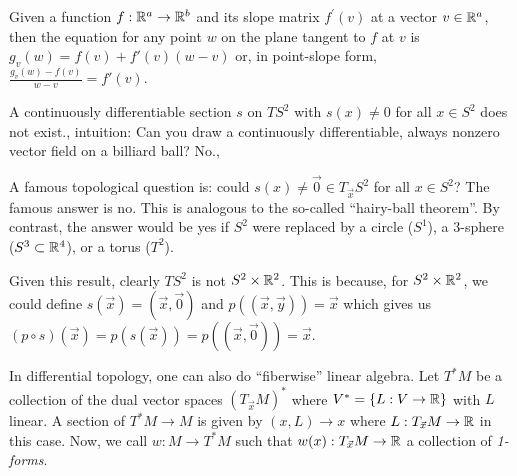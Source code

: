 \documentclass[11pt,leqno,oneside]{amsart}
\begin{document}
\begin{thm}
	Given a function $f : {\mathbb R}^a \to {\mathbb R}^b$ and its slope matrix $f^\prime(v)$ at a vector $v \in {\mathbb R}^a$, then the equation for any point $w$ on the plane tangent to $f$ at $v$ is $g_v(w) = f(v) + f'(v)(w-v)$ or, in point-slope form, $\frac{g_v(w)-f(v)}{w-v} = f'(v)$.
\end{thm}

\begin{thm}
	A continuously differentiable section $s$ on $TS^2$ with $s(x) \neq 0$ for all $x \in S^2$ does not exist.,
	intuition: Can you draw a continuously differentiable, always nonzero vector field on a billiard ball?  No.,
\end{thm}

A famous topological question is: could $s(x) \neq \vec{0} \in T_{\vec{x}}S^2$
for all $x \in S^2$? The famous answer is no. This is analogous to the
so-called ``hairy-ball theorem''. By contrast, the answer would be yes if $S^2$
were replaced by a circle ($S^1$), a 3-sphere ($S^3 \subset {\mathbb R}^4$), or a torus
($T^2$).

Given this result, clearly $TS^2$ is not $S^2 \times {\mathbb R}^2$. This is because,
for $S^2 \times {\mathbb R}^2$, we could define $s(\vec{x}) = (\vec{x}, \vec{0})$ and
$p( (\vec{x},\vec{y}) ) = \vec{x}$ which gives us $(p \circ s)(\vec{x}) =
p(s(\vec{x})) = p( (\vec{x}, \vec{0}) )= \vec{x}$.


In differential topology, one can also do ``fiberwise'' linear algebra. Let
$T^*M$ be a collection of the dual vector spaces $(T_{\vec{x}}M)^*$ where $V^* =
\{L: V \to {\mathbb R}\}$ with $L$ linear. A section of $T^*M \to M$ is given by $(x,L)
\to x$ where $L: T_{\vec{x}}M \to {\mathbb R}$ in this case. Now, we call $w: M \to
T^*M$ such that $w(x): T_{\vec{x}}M \to {\mathbb R}$ a collection of \emph{1-forms}.
\end{document}
